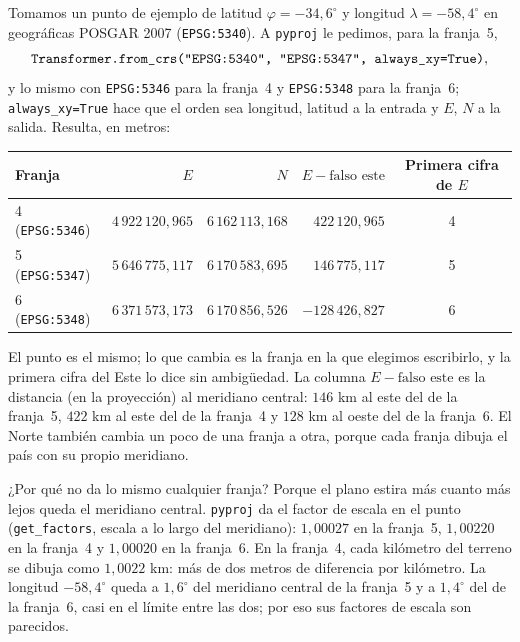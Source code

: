 \begin{ejemplo}\label{ej:fajas-digito}
Tomamos un punto de ejemplo de latitud \(\varphi=-34{,}6^\circ\) y longitud
\(\lambda=-58{,}4^\circ\) en geográficas POSGAR 2007 (\texttt{EPSG:5340}). A \texttt{pyproj}
le pedimos, para la franja~5,
\[
\texttt{Transformer.from\_crs(\textquotedbl{}EPSG:5340\textquotedbl{}, \textquotedbl{}EPSG:5347\textquotedbl{}, always\_xy=True)},
\]
y lo mismo con \texttt{EPSG:5346} para la franja~4 y \texttt{EPSG:5348} para la franja~6;
\texttt{always\_xy=True} hace que el orden sea longitud, latitud a la entrada y \(E\), \(N\) a la
salida. Resulta, en metros:
\begin{center}
\begin{tabular}{@{}lrrrc@{}}
\toprule
Franja & \(E\) & \(N\) & \(E-\text{falso este}\) & Primera cifra de \(E\)\\
\midrule
4 (\texttt{EPSG:5346}) & \(4\,922\,120{,}965\) & \(6\,162\,113{,}168\) & \(422\,120{,}965\) & 4\\
5 (\texttt{EPSG:5347}) & \(5\,646\,775{,}117\) & \(6\,170\,583{,}695\) & \(146\,775{,}117\) & 5\\
6 (\texttt{EPSG:5348}) & \(6\,371\,573{,}173\) & \(6\,170\,856{,}526\) & \(-128\,426{,}827\) & 6\\
\bottomrule
\end{tabular}
\end{center}
El punto es el mismo; lo que cambia es la franja en la que elegimos escribirlo, y la primera
cifra del Este lo dice sin ambigüedad. La columna \(E-\text{falso este}\) es la distancia (en la
proyección) al meridiano central: \(146\) km al este del de la franja~5, \(422\) km al este del
de la franja~4 y \(128\) km al oeste del de la franja~6. El Norte también cambia un poco de una
franja a otra, porque cada franja dibuja el país con su propio meridiano.

¿Por qué no da lo mismo cualquier franja? Porque el plano estira más cuanto más lejos queda el
meridiano central. \texttt{pyproj} da el factor de escala en el punto (\texttt{get\_factors},
escala a lo largo del meridiano): \(1{,}00027\) en la franja~5, \(1{,}00220\) en la franja~4 y
\(1{,}00020\) en la franja~6. En la franja~4, cada kilómetro del terreno se dibuja como
\(1{,}0022\) km: más de dos metros de diferencia por kilómetro. La longitud \(-58{,}4^\circ\)
queda a \(1{,}6^\circ\) del meridiano central de la franja~5 y a \(1{,}4^\circ\) del de la
franja~6, casi en el límite entre las dos; por eso sus factores de escala son parecidos.
\end{ejemplo}

